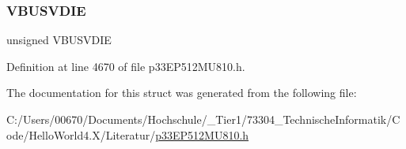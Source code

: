 \mbox{\label{structtag_u1_o_t_g_i_e_b_i_t_s_a6f1ab6ca457c84d887e60a0976da6ce3}} 
\subsubsection{\texorpdfstring{V\+B\+U\+S\+V\+D\+IE}{VBUSVDIE}}
{\footnotesize\ttfamily unsigned V\+B\+U\+S\+V\+D\+IE}



Definition at line 4670 of file p33\+E\+P512\+M\+U810.\+h.



The documentation for this struct was generated from the following file\+:\begin{DoxyCompactItemize}
\item 
C\+:/\+Users/00670/\+Documents/\+Hochschule/\+\_\+\+Tier1/73304\+\_\+\+Technische\+Informatik/\+Code/\+Hello\+World4.\+X/\+Literatur/\hyperlink{p33_e_p512_m_u810_8h}{p33\+E\+P512\+M\+U810.\+h}\end{DoxyCompactItemize}

